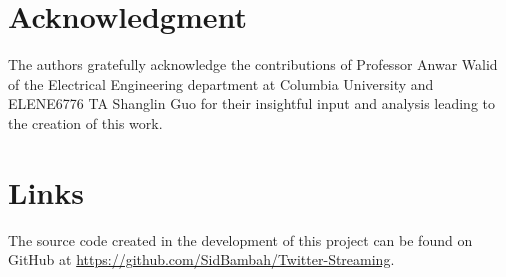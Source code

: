 \documentclass[conference]{IEEEtran}
\begin{document}
\section*{Acknowledgment}
The authors gratefully acknowledge the contributions of Professor Anwar Walid of the Electrical Engineering department at Columbia University and ELENE6776 TA Shanglin Guo for their insightful input and analysis leading to the creation of this work.


\nocite{*}

 \appendices

\section{Links}
The source code created in the development of this project can be found on GitHub at \url{https://github.com/SidBambah/Twitter-Streaming}. \par

\vspace{12pt}
\end{document}
